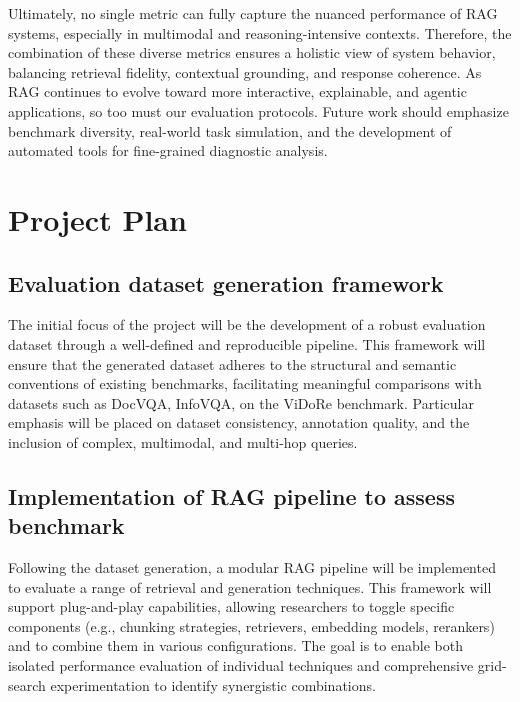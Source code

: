 \documentclass[12pt,twoside]{report}
\begin{document}
Ultimately, no single metric can fully capture the nuanced performance of RAG systems, especially in multimodal and reasoning-intensive contexts. Therefore, the combination of these diverse metrics ensures a holistic view of system behavior, balancing retrieval fidelity, contextual grounding, and response coherence. As RAG continues to evolve toward more interactive, explainable, and agentic applications, so too must our evaluation protocols. Future work should emphasize benchmark diversity, real-world task simulation, and the development of automated tools for fine-grained diagnostic analysis.




\chapter{Project Plan}
\section{Evaluation dataset generation framework}
The initial focus of the project will be the development of a robust evaluation dataset through a well-defined and reproducible pipeline. This framework will ensure that the generated dataset adheres to the structural and semantic conventions of existing benchmarks, facilitating meaningful comparisons with datasets such as DocVQA, InfoVQA, on the ViDoRe benchmark. Particular emphasis will be placed on dataset consistency, annotation quality, and the inclusion of complex, multimodal, and multi-hop queries.

\section{Implementation of RAG pipeline to assess benchmark}
Following the dataset generation, a modular RAG pipeline will be implemented to evaluate a range of retrieval and generation techniques. This framework will support plug-and-play capabilities, allowing researchers to toggle specific components (e.g., chunking strategies, retrievers, embedding models, rerankers) and to combine them in various configurations. The goal is to enable both isolated performance evaluation of individual techniques and comprehensive grid-search experimentation to identify synergistic combinations.
\end{document}
